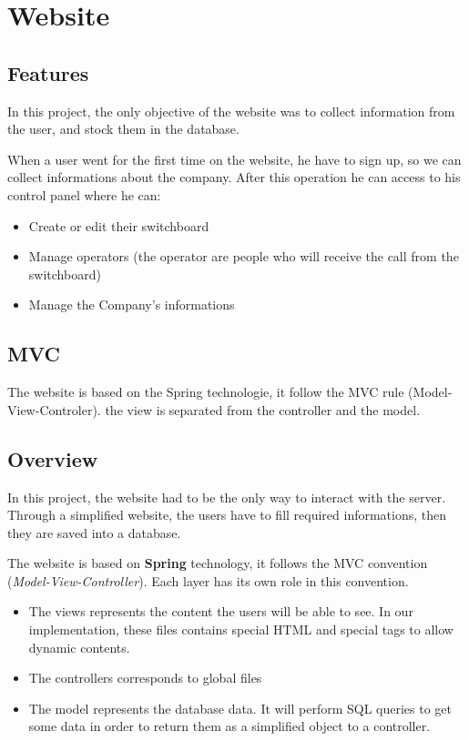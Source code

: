 \chapter{Website}
\section{Features}
In this project, the only objective of the website was to collect information from the user, and stock them in the database.

When a user went for the first time on the website, he have to sign up, so we can collect informations about the company. After this operation he can access to his control panel where he can:
\begin{itemize}  
\item Create or edit their switchboard
\item Manage operators (the operator are people who will receive the call from the switchboard)
\item Manage the Company's informations
\end{itemize}  



\section{MVC}
The website is based on the Spring technologie,  it follow the MVC rule (Model-View-Controler). the view is separated from the controller and the model.


\section{Overview}
In this project, the website had to be the only way to interact with the server. Through a simplified website, the users have to fill required informations, then they are saved into a database.
\newline

The website is based on \textbf{Spring} technology,  it follows the MVC convention (\textit{Model-View-Controller}). Each layer has its own role in this convention.


\begin{itemize}  
\item The views represents the content the users will be able to see. In our implementation, these files contains special HTML and special tags to allow dynamic contents. 
\item The controllers corresponds to global files 
\item The model represents the database data. It will perform SQL queries to get some data in order to return them as a simplified object to a controller.

\end{itemize}  

